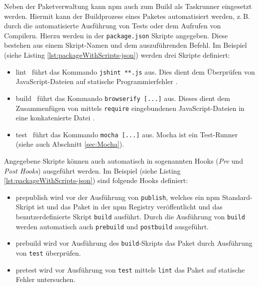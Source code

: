 \begin{figure}[H]
	
\end{figure}

Neben der Paketverwaltung kann npm auch zum Build als Taskrunner eingesetzt werden. Hiermit kann der Buildprozess eines Paketes automatisiert werden, z.\,B. durch die automatisierte Ausführung von Tests oder dem Aufrufen von Compilern. Hierzu werden in der \texttt{package.json} Skripte angegeben. Diese bestehen aus einem Skript-Namen und dem auszuführenden Befehl. Im Beispiel (siehe Listing \ref{lst:packageWithScripts-json}) werden drei Skripte definiert: \cite{cirkel-npmAsABuildTool}
\begin{itemize}
	\item \glqq lint\grqq~ führt das Kommando \texttt{jshint **.js} aus. Dies dient dem Überprüfen von JavaScript-Dateien auf statische Programmierfehler \cite{jshint-about}.
	\item \glqq build\grqq~ führt das Kommando \texttt{browserify [...]} aus. Dieses dient dem Zusammenfügen von mittels \texttt{require} eingebundenen JavaScript-Dateien in eine konkatenierte Datei \cite{browserify-about}.
	\item \glqq test\grqq~ führt das Kommando \texttt{mocha [...]} aus. Mocha ist ein Test-Runner (siehe auch Abschnitt \ref{sec:Mocha}).
\end{itemize}

Angegebene Skripte können auch automatisch in sogenannten Hooks (\textit{Pre} und \textit{Post Hooks}) ausgeführt werden. Im Beispiel (siehe Listing \ref{lst:packageWithScripts-json}) sind folgende Hooks definiert: \cite{cirkel-npmAsABuildTool}
\begin{itemize}
	\item \glqq prepublish\grqq{} wird vor der Ausführung von \texttt{publish}, welches ein npm Standard-Skript ist und das Paket in der npm Registry veröffentlicht \cite{npm-publish} und das benutzerdefinierte Skript \texttt{build} ausführt. Durch die Ausführung von \texttt{build} werden automatisch auch \texttt{prebuild} und \texttt{postbuild} ausgeführt.
	\item \glqq prebuild\grqq{} wird vor Ausführung des \texttt{build}-Skripts das Paket durch Ausführung von \texttt{test} überprüfen.
	\item \glqq pretest\grqq{} wird vor Ausführung von \texttt{test} mittels \texttt{lint} das Paket auf statische Fehler untersuchen.
\end{itemize}


